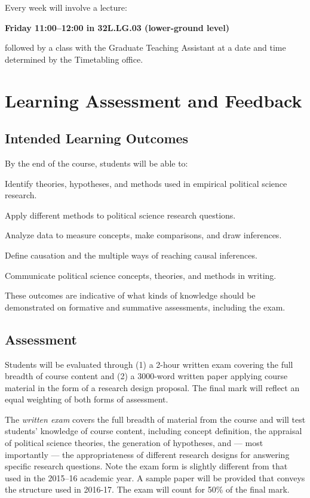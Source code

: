 \documentclass[12pt,a4paper]{article}
\begin{document}
Every week will involve a lecture:

	\begin{center}
	\textbf{Friday 11:00--12:00 in 32L.LG.03 (lower-ground level)}
	\end{center}

followed by a class with the Graduate Teaching Assistant at a date and time determined by the Timetabling office.

\section{Learning Assessment and Feedback}

\subsection{Intended Learning Outcomes}

By the end of the course, students will be able to:

\begin{enumerate*}
\item Identify theories, hypotheses, and methods used in empirical political science research.
\item Apply different methods to political science research questions.
\item Analyze data to measure concepts, make comparisons, and draw inferences.
\item Define causation and the multiple ways of reaching causal inferences.
\item Communicate political science concepts, theories, and methods in writing.
\end{enumerate*}

These outcomes are indicative of what kinds of knowledge should be demonstrated on formative and summative assessments, including the exam.


\subsection{Assessment}

Students will be evaluated through (1) a 2-hour written exam covering the full breadth of course content and (2) a 3000-word written paper applying course material in the form of a research design proposal. The final mark will reflect an equal weighting of both forms of assessment.

The \textit{written exam} covers the full breadth of material from the course and will test students' knowledge of course content, including concept definition, the appraisal of political science theories, the generation of hypotheses, and --- most importantly --- the appropriateness of different research designs for answering specific research questions. Note the exam form is slightly different from that used in the 2015--16 academic year. A sample paper will be provided that conveys the structure used in 2016-17. The exam will count for 50\% of the final mark.
\end{document}
